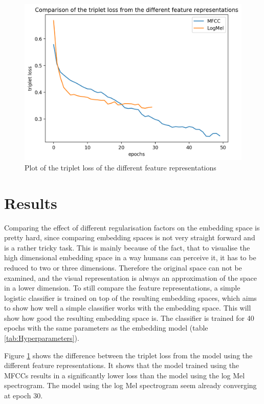 \documentclass[twocolumn]{article}
\begin{document}
\begin{figure}[t]
\centering
    \includegraphics[width=\linewidth]{assets/triplet_loss_feature_representation.png}
    \caption{Plot of the triplet loss of the different feature representations}
    \label{fig:plot-triplet-loss-feature-representations}
\end{figure}

\section{Results}
Comparing the effect of different regularisation factors on the embedding space is pretty hard, since comparing embedding spaces is not very straight forward and is a rather tricky task. This is mainly because of the fact, that to visualise the high dimensional embedding space in a way humans can perceive it, it has to be reduced to two or three dimensions. Therefore the original space can not be examined, and the visual representation is always an approximation of the space in a lower dimension. To still compare the feature representations, a simple logistic classifier is trained on top of the resulting embedding spaces, which aims to show how well a simple classifier works with the embedding space. This will show how good the resulting embedding space is. The classifier is trained for 40 epochs with the same parameters as the embedding model (table \ref{tab:Hyperparameters}).

Figure \ref{fig:plot-triplet-loss-feature-representations} shows the difference between the triplet loss from the model using the different feature representations. It shows that the model trained using the MFCCs results in a significantly lower loss than the model using the log Mel spectrogram. The model using the log Mel spectrogram seem already converging at epoch 30.
\end{document}
